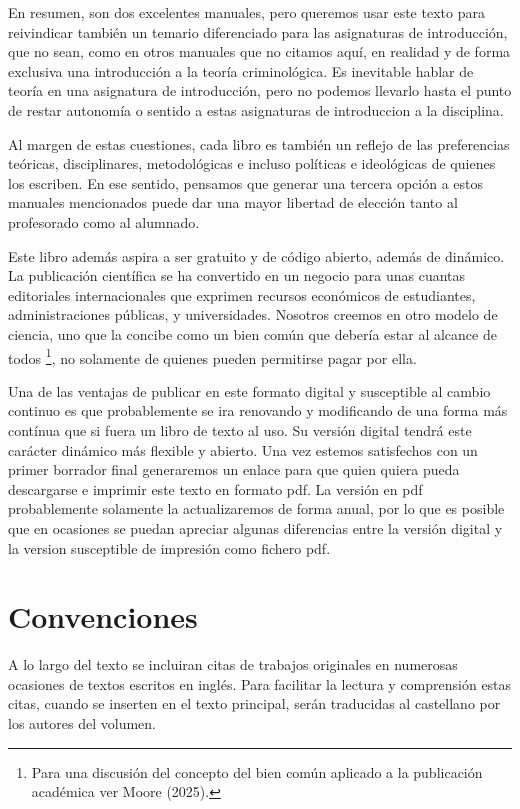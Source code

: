 \documentclass[
  spanish,
  letterpaper,
  DIV=11,
  numbers=noendperiod]{scrreprt}
\begin{document}
En resumen, son dos excelentes manuales, pero queremos usar este texto
para reivindicar también un temario diferenciado para las asignaturas de
introducción, que no sean, como en otros manuales que no citamos aquí,
en realidad y de forma exclusiva una introducción a la teoría
criminológica. Es inevitable hablar de teoría en una asignatura de
introducción, pero no podemos llevarlo hasta el punto de restar
autonomía o sentido a estas asignaturas de introduccion a la disciplina.

Al margen de estas cuestiones, cada libro es también un reflejo de las
preferencias teóricas, disciplinares, metodológicas e incluso políticas
e ideológicas de quienes los escriben. En ese sentido, pensamos que
generar una tercera opción a estos manuales mencionados puede dar una
mayor libertad de elección tanto al profesorado como al alumnado.

Este libro además aspira a ser gratuito y de código abierto, además de
dinámico. La publicación científica se ha convertido en un negocio para
unas cuantas editoriales internacionales que exprimen recursos
económicos de estudiantes, administraciones públicas, y universidades.
Nosotros creemos en otro modelo de ciencia, uno que la concibe como un
bien común que debería estar al alcance de todos \footnote{Para una
  discusión del concepto del bien común aplicado a la publicación
  académica ver Moore (2025).}, no solamente de quienes pueden
permitirse pagar por ella.

Una de las ventajas de publicar en este formato digital y susceptible al
cambio continuo es que probablemente se ira renovando y modificando de
una forma más contínua que si fuera un libro de texto al uso. Su versión
digital tendrá este carácter dinámico más flexible y abierto. Una vez
estemos satisfechos con un primer borrador final generaremos un enlace
para que quien quiera pueda descargarse e imprimir este texto en formato
pdf. La versión en pdf probablemente solamente la actualizaremos de
forma anual, por lo que es posible que en ocasiones se puedan apreciar
algunas diferencias entre la versión digital y la version susceptible de
impresión como fichero pdf.

\section*{Convenciones}\label{convenciones}


A lo largo del texto se incluiran citas de trabajos originales en
numerosas ocasiones de textos escritos en inglés. Para facilitar la
lectura y comprensión estas citas, cuando se inserten en el texto
principal, serán traducidas al castellano por los autores del volumen.
\end{document}
